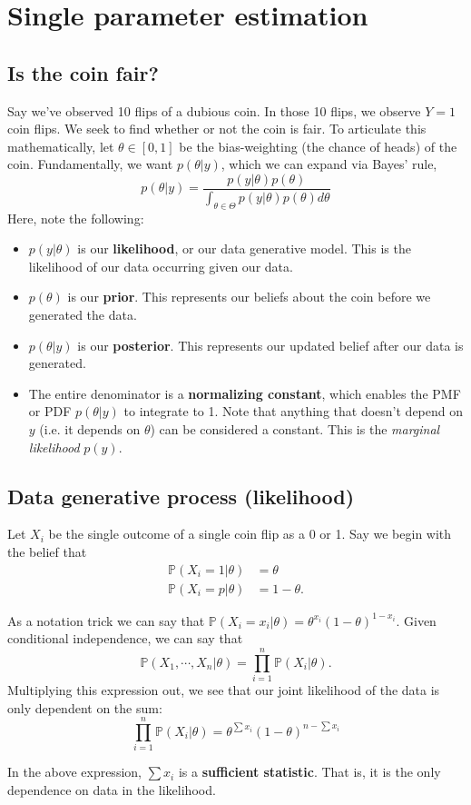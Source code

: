 \documentclass[titlepage, 12pt, leqno]{article}
\begin{document}
\pagebreak
\section{Single parameter estimation}
\subsection{Is the coin fair?}
Say we've observed 10 flips of a dubious coin. In those 10 flips, we observe 
$Y=1$ coin flips. We seek to find whether or not the coin is fair. To articulate
this mathematically, let $\theta \in [0,1]$ be the bias-weighting (the chance of
heads) of the coin. Fundamentally, we want $p(\theta|y)$, which we can expand via
Bayes' rule,
\[
p(\theta|y) = \frac{p(y|\theta)p(\theta)}{\int_{\theta \in \Theta}p(y|\theta)
p(\theta)d \theta}
\]
Here, note the following:
\begin{itemize}
    \item $p(y|\theta)$ is our \textbf{likelihood}, or our data generative model.
        This is the likelihood of our data occurring given our data.
    \item $p(\theta)$ is our \textbf{prior}. This represents our beliefs about
        the coin before we generated the data.
    \item $p(\theta|y)$ is our \textbf{posterior}. This represents our updated
        belief after our data is generated.
    \item The entire denominator is a \textbf{normalizing constant}, which 
        enables the PMF or PDF $p(\theta|y)$ to integrate to 1. Note that 
        anything that doesn't depend on $y$ (i.e. it depends on $\theta$) can be 
        considered a constant. This is the \textit{marginal likelihood} $p(y)$.
\end{itemize}

\subsection{Data generative process (likelihood)}
Let $X_i$ be the single outcome of a single coin flip as a 0 or 1. Say we begin
with the belief that
\begin{align*}
    \mathbb{P}(X_i =1|\theta) &= \theta \\
    \mathbb{P}(X_i =p|\theta) &= 1-\theta .
\end{align*}

As a notation trick we can say that $\mathbb{P}(X_i = x_i|\theta) = \theta^{x_i}
(1-\theta)^{1-x_i}$. Given conditional independence, we can say that
\[
\mathbb{P}(X_1, \cdots , X_n | \theta) = \prod_{i=1}^{n}\mathbb{P}(X_i | \theta).
\]
Multiplying this expression out, we see that our joint likelihood of the data is
only dependent on the sum:
\[
\prod_{i=1}^{n}\mathbb{P}(X_i | \theta) = \theta^{\sum x_i}(1-\theta)^{n-
\sum x_i}
\]
\begin{definition}
    In the above expression, $\sum x_i$ is a \textbf{sufficient statistic}. That
    is, it is the only dependence on data in the likelihood.
\end{definition}
\end{document}
